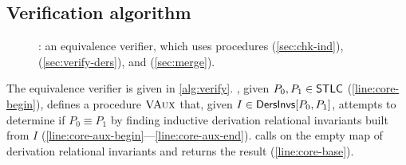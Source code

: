 \subsection{Verification algorithm}
\label{sec:verifier}
\begin{figure}
  \centering
\begin{algorithm}[H]
  {  \label{line:core-aux-end} %
    \Return{$\verifyaux(\emptyset)$} \label{line:core-base} } %
  \caption{%
    \verify: an equivalence verifier, which uses procedures
    \chkinductive (\autoref{sec:chk-ind}), \verifyders
    (\autoref{sec:verify-ders}), and %
    \mergeinvs (\autoref{sec:merge}).  }
  \label{alg:verify}
\end{algorithm}
\end{figure}

The equivalence verifier \verify is given in \autoref{alg:verify}.
%
\verify, given $P_0, P_1 \in \mathsf{STLC}$ (\autoref{line:core-begin}),
defines a procedure $\textsc{VAux}$ that, given $I \in
\mathsf{DersInvs}[ P_0, P_1 ]$, attempts to determine if $P_0 \equiv P_1$ by
finding inductive derivation relational invariants built from $I$
(\autoref{line:core-aux-begin}---\autoref{line:core-aux-end}).
%
\verify calls \verifyaux on the empty map of derivation relational
invariants and returns the result (\autoref{line:core-base}).

